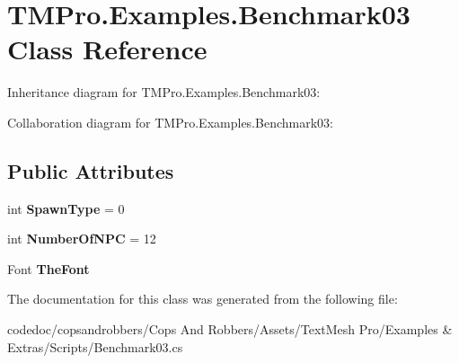 \hypertarget{classTMPro_1_1Examples_1_1Benchmark03}{}\section{T\+M\+Pro.\+Examples.\+Benchmark03 Class Reference}
\label{classTMPro_1_1Examples_1_1Benchmark03}


Inheritance diagram for T\+M\+Pro.\+Examples.\+Benchmark03\+:


Collaboration diagram for T\+M\+Pro.\+Examples.\+Benchmark03\+:
\subsection*{Public Attributes}
\begin{DoxyCompactItemize}
\item 
\mbox{\label{classTMPro_1_1Examples_1_1Benchmark03_ae0595654d8160315bd25697058905374}} 
int {\bfseries Spawn\+Type} = 0
\item 
\mbox{\label{classTMPro_1_1Examples_1_1Benchmark03_ad5c82c8274151538fc80d71b6957fdbe}} 
int {\bfseries Number\+Of\+N\+PC} = 12
\item 
\mbox{\label{classTMPro_1_1Examples_1_1Benchmark03_ad5ac07c246de5f50a0272846a75d64ad}} 
Font {\bfseries The\+Font}
\end{DoxyCompactItemize}


The documentation for this class was generated from the following file\+:\begin{DoxyCompactItemize}
\item 
codedoc/copsandrobbers/\+Cops And Robbers/\+Assets/\+Text\+Mesh Pro/\+Examples \& Extras/\+Scripts/Benchmark03.\+cs\end{DoxyCompactItemize}
